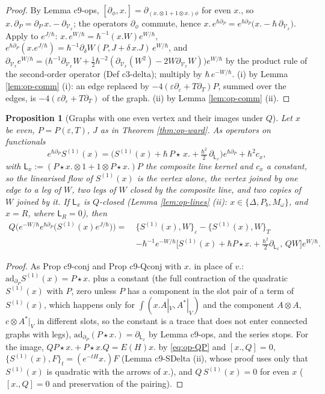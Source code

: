 \documentclass[11pt]{article}
\numberwithin{equation}{section}
\theoremstyle{plain}
\newtheorem{proposition}[theorem]{Proposition}
\theoremstyle{definition}
\newcommand{\AV}{A|_V}
\newcommand{\Pst}{P\star}
\newcommand{\Var}{\mathcal V}
\begin{document}
\begin{proof}
By Lemma c9-ops, $[\partial_\phi,x.]=\partial_{(x.\otimes1+1\otimes x.)\phi}$ for even $x.$, so $x.\,\partial_P=\partial_P\,x.-\partial_{\Var_x}$; the operators $\partial_\phi$ commute, hence $x.\,e^{\hbar\partial_P}=e^{\hbar\partial_P}\big(x.-\hbar\,\partial_{\Var_x}\big)$. Apply to $e^{J/\hbar}$: $x.\,e^{W/\hbar}=\hbar^{-1}(x.W)e^{W/\hbar}$, $e^{\hbar\partial_P}(x.e^{J/\hbar})=\hbar^{-1}\partial_\delta W(P,J+\delta\,x.J)\,e^{W/\hbar}$, and $\partial_{\Var_x}e^{W/\hbar}=\big(\hbar^{-1}\partial_{\Var_x}W+\tfrac12\hbar^{-2}(\partial_{\Var_x}(W^2)-2W\partial_{\Var_x}W)\big)e^{W/\hbar}$ by the product rule of the second-order operator (Def c3-delta); multiply by $\hbar\,e^{-W/\hbar}$. (i) by Lemma \ref{lem:op-comm} (i): an edge replaced by $-4(\varepsilon\partial_\varepsilon+T\partial_T)P$, summed over the edges, is $-4(\varepsilon\partial_\varepsilon+T\partial_T)$ of the graph. (ii) by Lemma \ref{lem:op-comm} (ii).
\end{proof}

\begin{proposition}[Graphs with one even vertex and their images under $Q$]
\label{prop:op-conjflow}
Let $x$ be even, $P=P(\varepsilon,T)$, $J$ as in Theorem \ref{thm:op-ward}. As operators on functionals
\[
e^{\hbar\partial_P}S^{(1)}(x)=\Big(S^{(1)}(x)+\hbar\,\Pst\,x.+\tfrac{\hbar^2}2\,\partial_{\mathsf L_x}\Big)e^{\hbar\partial_P}+\hbar^2c_x,
\]
with $\mathsf L_x:=(\Pst x.\otimes1+1\otimes\Pst x.)P$ the composite line kernel and $c_x$ a constant, so the linearised flow of $S^{(1)}(x)$ is the vertex alone, the vertex joined by one edge to a leg of $W$, two legs of $W$ closed by the composite line, and two copies of $W$ joined by it. If $\mathsf L_x$ is $Q$-closed (Lemma \ref{lem:op-lines} (ii): $x\in\{\Delta,P_b,M_\omega\}$, and $x=R$, where $\mathsf L_R=0$), then
\[
\begin{aligned}
Q\Big(e^{-W/\hbar}e^{\hbar\partial_P}\big(S^{(1)}(x)e^{J/\hbar}\big)\Big)=\ &\{S^{(1)}(x),W\}_\varepsilon-\{S^{(1)}(x),W\}_T\\
&-\hbar^{-1}e^{-W/\hbar}\Big[S^{(1)}(x)+\hbar\Pst x.+\tfrac{\hbar^2}2\partial_{\mathsf L_x},\,QW\Big]e^{W/\hbar}.
\end{aligned}
\]
\end{proposition}

\begin{proof}
As Prop c9-conj and Prop c9-Qconj with $x.$ in place of $v.$: $\mathrm{ad}_{\partial_P}S^{(1)}(x)=\Pst x.$ plus a constant (the full contraction of the quadratic $S^{(1)}(x)$ with $P$, zero unless $P$ has a component in the slot pair of a term of $S^{(1)}(x)$, which happens only for $\int(x.\AV,A^*|_V)$ and the component $A\otimes A$, $c\otimes A^*|_V$ in different slots, so the constant is a trace that does not enter connected graphs with legs), $\mathrm{ad}_{\partial_P}(\Pst x.)=\partial_{\mathsf L_x}$ by Lemma c9-ops, and the series stops. For the image, $Q\Pst x.+\Pst x.Q=E(H)x.$ by \eqref{eq:op-QP} and $[x.,Q]=0$, $\{S^{(1)}(x),F\}_t=(e^{-tH}x.)F$ (Lemma c9-SDelta (ii), whose proof uses only that $S^{(1)}(x)$ is quadratic with the arrows of $x.$), and $Q\,S^{(1)}(x)=0$ for even $x$ ($[x.,Q]=0$ and preservation of the pairing).
\end{proof}
\end{document}
